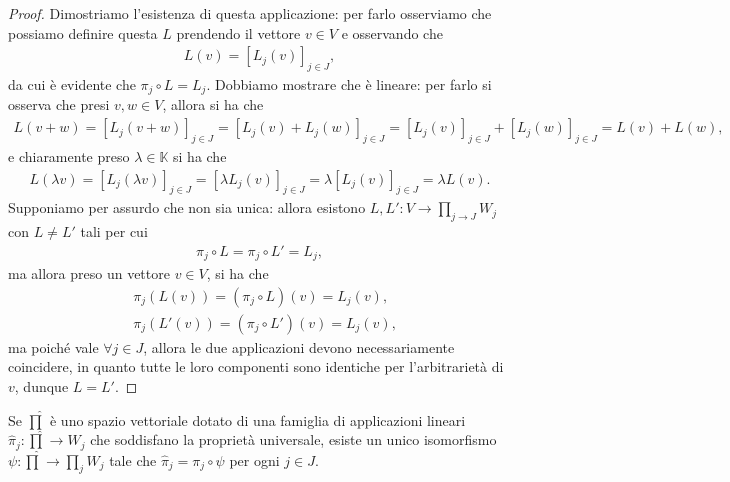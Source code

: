 \begin{proof}
    Dimostriamo l'esistenza di questa applicazione: per farlo osserviamo che possiamo definire questa $L$ prendendo il vettore $v \in V$ e osservando che
    \begin{align}
        L(v) = [L_j(v)]_{j \in J},
    \end{align}
    da cui è evidente che $\pi_j \circ L = L_j$. Dobbiamo mostrare che è lineare: per farlo si osserva che presi $v, w \in V$, allora si ha che
    \begin{align}
        L(v + w) = [L_j(v + w)]_{j \in J} = [L_j(v) + L_j(w)]_{j \in J} = [L_j(v)]_{j \in J} + [L_j(w)]_{j \in J} = L(v) + L(w),
    \end{align}
    e chiaramente preso $\lambda \in \mathbb{K}$ si ha che
    \begin{align}
        L(\lambda v) = [L_j(\lambda v)]_{j \in J} = [\lambda L_j(v)]_{j \in J} = \lambda[L_j(v)]_{j \in J} = \lambda L(v).
    \end{align}
    Supponiamo per assurdo che non sia unica: allora esistono $L, L': V \to \prod_{j \to J} W_j$ con $L \neq L'$ tali per cui
    \begin{align}
        \pi_j \circ L = \pi_j \circ L' = L_j,
    \end{align}
    ma allora preso un vettore $v \in V$, si ha che
    \begin{align}
        &\pi_j(L(v)) = (\pi_j \circ L)(v) = L_j(v), \\
        &\pi_j(L'(v)) = (\pi_j \circ L')(v) = L_j(v),
    \end{align}
    ma poiché vale $\forall j \in J$, allora le due applicazioni devono necessariamente coincidere, in quanto tutte le loro componenti sono identiche per l'arbitrarietà di $v$, dunque $L = L'$.
\end{proof}
\begin{cor}
    Se $\hat{\prod}$ è uno spazio vettoriale dotato di una famiglia di applicazioni lineari $\hat{\pi}_j: \hat{\prod} \to W_j$ che soddisfano la proprietà universale, esiste un unico isomorfismo $\psi: \hat{\prod} \to \prod_j W_j$ tale che $\hat{\pi}_j = \pi_j \circ \psi$ per ogni $j \in J$.
\end{cor}
